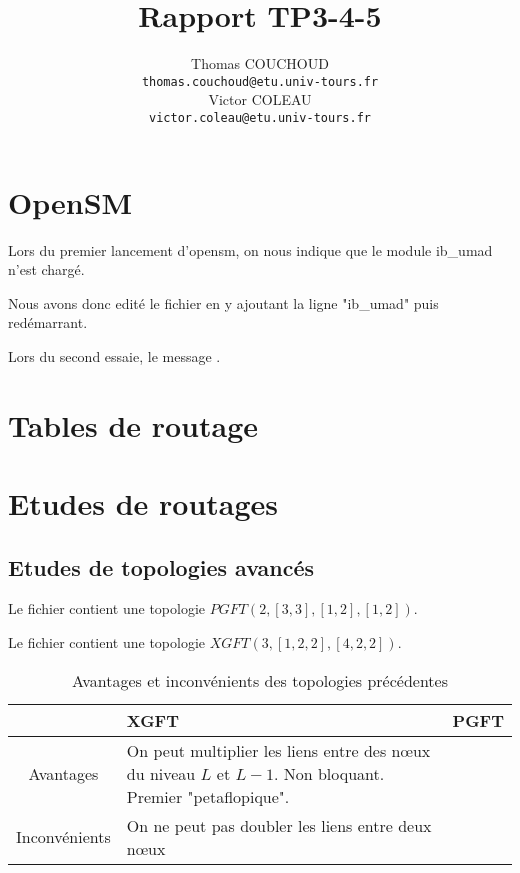 \documentclass{report}
\title{Rapport TP3-4-5}
\author{Thomas COUCHOUD\\\texttt{thomas.couchoud@etu.univ-tours.fr}\\Victor COLEAU\\\texttt{victor.coleau@etu.univ-tours.fr}}
\begin{document}
	\mccTitle[no]
	\tableofcontents

	\chapter{OpenSM}
		Lors du premier lancement d'opensm, on nous indique que le module ib\_umad n'est chargé.
		
		Nous avons donc edité le fichier  en y ajoutant la ligne "ib\_umad" puis redémarrant.
		
		Lors du second essaie, le message .
	
	\chapter{Tables de routage}
	
	\chapter{Etudes de routages}
		\section{Etudes de topologies avancés}
			Le fichier  contient une topologie $PGFT\left( 2,\left[ 3,3\right], \left[ 1,2\right], \left[ 1,2\right]\right)$.
			
			Le fichier  contient une topologie $XGFT\left( 3, \left[ 1,2,2\right], \left[ 4,2,2\right]\right)$.
			
			\begin{table}[H]%
				\begin{tabularx}{0.99\textwidth}{|c|X|X|}
					\hline
					& XGFT & PGFT\\\hline\endhead
					Avantages & On peut multiplier les liens entre des n\oe ux du niveau $L$ et $L-1$. Non bloquant. Premier "petaflopique".& \\\hline
					Inconvénients & On ne peut pas doubler les liens entre deux n\oe ux & \\\hline	
				\end{tabularx}
				\caption{Avantages et inconvénients des topologies précédentes}
			\end{table}
			
		
\end{document}
